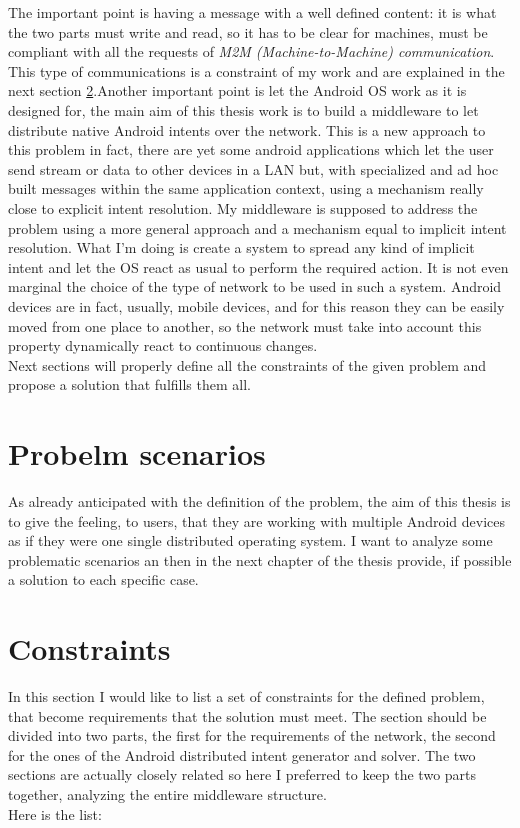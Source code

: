 The important point is having a message with a well defined content: it is what the two parts must write and read, so it has to be clear for machines, must be compliant with all the requests of \textit{M2M (Machine-to-Machine) communication}. This type of communications is a constraint of my work and are explained in the next section \ref{problemconstraints}.Another important point is let the Android OS work as it is designed for, the main aim of this thesis work is to build a middleware to let distribute native Android intents over the network. This is a new approach to this problem in fact, there are yet some android applications which let the user send stream or data to other devices in a LAN but, with specialized and ad hoc built messages within the same application context, using a mechanism really close to explicit intent resolution. My middleware is supposed to address the problem using a more general approach and a mechanism equal to implicit intent resolution. What I'm doing is create a system to spread any kind of implicit intent and let the OS react as usual to perform the required action.
It is not even marginal the choice of the type of network to be used in such a system. Android devices are in fact, usually, mobile devices, and for this reason they can be easily moved from one place to another, so the network must take into account this property dynamically react to continuous changes.\\
Next sections will properly define all the constraints of the given problem and propose a solution that fulfills them all.
\section{Probelm scenarios}
As already anticipated with the definition of the problem,  the aim of this thesis is to give the feeling, to users, that they are working with multiple Android devices as if they were one single distributed operating system. I want to analyze some problematic scenarios an then in the next chapter of the thesis provide, if possible a solution to each specific case.
\section{Constraints} \label{problemconstraints}
In this section I would like to list a set of  constraints for the defined problem, that become requirements that the solution must meet. The section should be divided into two parts, the first for the requirements of the network, the second for the ones of the Android distributed intent generator and solver. The two sections are actually closely related so here I preferred to keep the two parts together, analyzing the entire middleware structure.\\ 
Here is the list:

